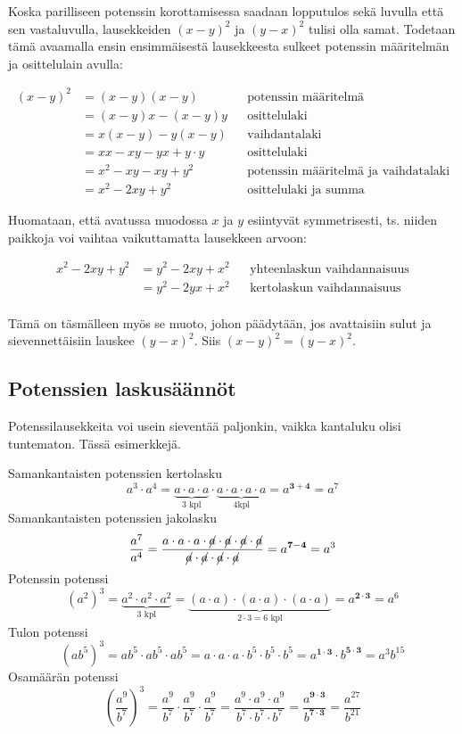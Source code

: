 \begin{esimerkki}

Koska parilliseen potenssin korottamisessa saadaan lopputulos sekä luvulla että sen vastaluvulla, lausekkeiden $(x-y)^2$ ja $(y-x)^2$ tulisi olla samat. Todetaan tämä avaamalla ensin ensimmäisestä lausekkeesta sulkeet potenssin määritelmän ja osittelulain avulla:

	\begin{align*}
	(x-y)^2
	&=(x-y)(x-y) && \text{potenssin määritelmä} \\
	&=(x-y)x-(x-y)y && \text{osittelulaki} \\
	&=x(x-y)-y(x-y) && \text{vaihdantalaki} \\
	&=xx-xy-yx+y\cdot y && \text{osittelulaki} \\
	&=x^2-xy-xy+y^2 && \text{potenssin määritelmä ja vaihdatalaki} \\
	&=x^2-2xy+y^2 && \text{osittelulaki ja summa}
	\end{align*}
	
	Huomataan, että avatussa muodossa $x$ ja $y$ esiintyvät symmetrisesti, ts. niiden paikkoja voi vaihtaa vaikuttamatta lausekkeen arvoon:
	
	\begin{align*}
	x^2-2xy+y^2
	&=y^2-2xy+x^2 && \text{yhteenlaskun vaihdannaisuus} \\
	&=y^2-2yx+x^2  && \text{kertolaskun vaihdannaisuus} \\
	\end{align*}
	
Tämä on täsmälleen myös se muoto, johon päädytään, jos avattaisiin sulut ja sievennettäisiin lauskee $(y-x)^2$. Siis $(x-y)^2=(y-x)^2$.
\end{esimerkki} %

\subsection{Potenssien laskusäännöt}

Potenssilausekkeita voi usein sieventää paljonkin, vaikka kantaluku olisi tuntematon. Tässä esimerkkejä.    
    
    Samankantaisten potenssien kertolasku
	\[
a^3\cdot a^4=\underbrace{a\cdot a\cdot a}_{\text{3 kpl}}\cdot \underbrace{a\cdot a\cdot a\cdot a}_{\text{4kpl}}=a^{\mathbf{3+4}}=a^7
    	\]
    Samankantaisten potenssien jakolasku
	\[
\frac{a^7}{a^4}=\frac{a\cdot a\cdot a\cdot \cancel{a}\cdot \cancel{a}\cdot \cancel{a}\cdot \cancel{a}}	{\cancel{a}\cdot \cancel{a}\cdot \cancel{a}\cdot \cancel{a}}=a^{\mathbf{7-4}}=a^3
    	\]
    Potenssin potenssi
	\[
(a^2)^3=\underbrace{a^2\cdot a^2\cdot a^2}_{3\text{ kpl}}=
\underbrace{(a\cdot a)\cdot (a\cdot a)\cdot (a\cdot a)}_{2\cdot 3=6\text{ kpl}}=a^{\boldsymbol{{2\cdot 3}}}=a^6
\]
    Tulon potenssi
	\[
(ab^5)^3=ab^5\cdot ab^5\cdot ab^5=a\cdot a\cdot a\cdot b^5\cdot b^5\cdot b^5=a^{\mathbf{1\cdot 3}}\cdot b^{\mathbf{5\cdot 3}}=a^3b^{15}
	\]
     Osamäärän potenssi
	\[
	\left(\frac{a^9}{b^7}\right)^3=\frac{a^9}{b^7}\cdot \frac{a^9}{b^7}\cdot \frac{a^9}{b^7}=\frac{a^9\cdot a^9\cdot a^9}{b^7\cdot b^7\cdot b^7}=\frac{a^{\mathbf{9\cdot 3}}}{b^{\mathbf{7\cdot 3}}}=\frac{a^{27}}{b^{21}}
	\]

